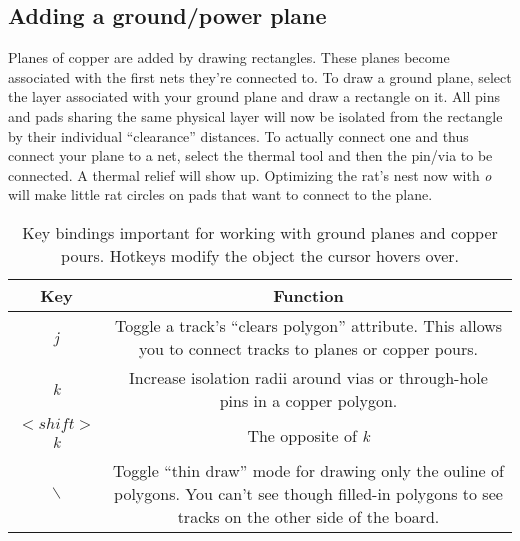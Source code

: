 \subsection{Adding a ground/power plane}
Planes of copper are added by drawing rectangles.  These planes become associated with the first nets they're connected to.  To draw a ground plane, select the layer associated with your ground plane and draw a rectangle on it.  All pins and pads sharing the same physical layer will now be isolated from the rectangle by their individual ``clearance'' distances.  To actually connect one and thus connect your plane to a net, select the thermal tool and then the pin/via to be connected.  A thermal relief will show up.  Optimizing the rat's nest now with \textsl{o} will make little rat circles on pads that want to connect to the plane.

\begin{table}[htb]
\begin{center}
\begin{tabular}{|c|c|}\hline
Key	&Function \\ \hline \hline

\textsl{j}	
&\parbox[c][1.5\height][c]{5cm}{Toggle a track's ``clears polygon'' attribute.  This allows you to connect tracks to planes or copper pours.}\\ 
\hline

\textsl{k}
&\parbox[c][1.5\height][c]{5cm}{Increase isolation radii around vias or through-hole pins in a copper polygon.}\\
\hline

$<shift>$\textsl{k}
&\parbox[c][1.5\height][c]{5cm}{The opposite of \textsl{k}}\\
\hline

$\backslash$
&\parbox[c][1.5\height][c]{5cm}{Toggle ``thin draw'' mode for drawing only the ouline of polygons.  You can't see though filled-in polygons to see tracks on the other side of the board.}\\
\hline

\end{tabular}
\end{center}
\caption{Key bindings important for working with ground planes and copper pours.  Hotkeys modify the object the cursor hovers over.\label{pour_table}}
\end{table}



